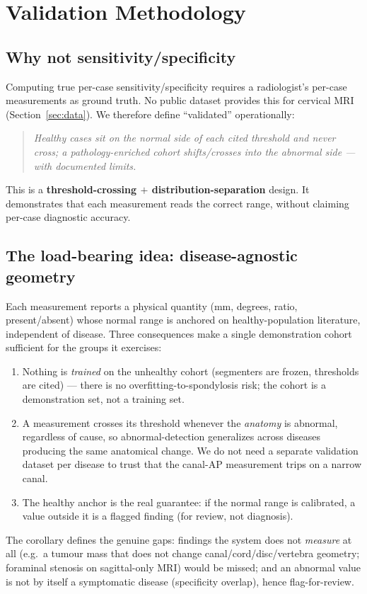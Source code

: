 \section{Validation Methodology}
\label{sec:valmethod}

\subsection{Why not sensitivity/specificity}
Computing true per-case sensitivity/specificity requires a radiologist's per-case measurements as ground
truth. No public dataset provides this for cervical MRI (Section~\ref{sec:data}). We therefore define
``validated'' operationally:
\begin{quote}
\emph{Healthy cases sit on the normal side of each cited threshold and never cross; a pathology-enriched
cohort shifts/crosses into the abnormal side --- with documented limits.}
\end{quote}
This is a \textbf{threshold-crossing $+$ distribution-separation} design. It demonstrates that each
measurement reads the correct range, without claiming per-case diagnostic accuracy.

\subsection{The load-bearing idea: disease-agnostic geometry}
Each measurement reports a physical quantity (mm, degrees, ratio, present/absent) whose normal range is
anchored on healthy-population literature, independent of disease. Three consequences make a single
demonstration cohort sufficient for the groups it exercises:
\begin{enumerate}[leftmargin=*]
  \item Nothing is \emph{trained} on the unhealthy cohort (segmenters are frozen, thresholds are cited)
  --- there is no overfitting-to-spondylosis risk; the cohort is a demonstration set, not a training set.
  \item A measurement crosses its threshold whenever the \emph{anatomy} is abnormal, regardless of cause,
  so abnormal-detection generalizes across diseases producing the same anatomical change. We do not need
  a separate validation dataset per disease to trust that the canal-AP measurement trips on a narrow canal.
  \item The healthy anchor is the real guarantee: if the normal range is calibrated, a value outside it is
  a flagged finding (for review, not diagnosis).
\end{enumerate}
The corollary defines the genuine gaps: findings the system does not \emph{measure} at all (e.g.\ a
tumour mass that does not change canal/cord/disc/vertebra geometry; foraminal stenosis on sagittal-only
MRI) would be missed; and an abnormal value is not by itself a symptomatic disease (specificity overlap),
hence flag-for-review.

